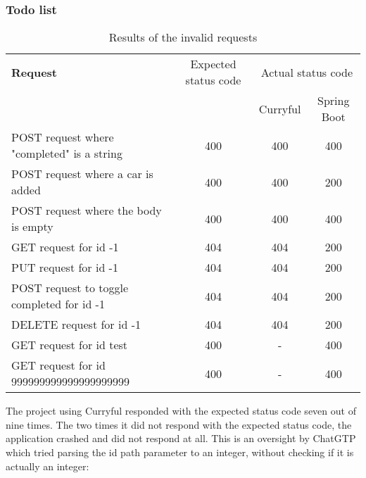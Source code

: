 \documentclass[a4paper]{article}
\begin{document}
\subsubsection{Todo list}
\begin{table}[h!]
	\begin{tabularx}{\textwidth}{|X|c|c|c|}
		\hline
		\textbf{Request}                           & Expected status code & \multicolumn{2}{c|}{Actual status code}               \\
		                                           &                      & Curryful                                & Spring Boot \\
		\hline
		POST request where "completed" is a string & 400                  & 400                                     & 400         \\
		POST request where a car is added          & 400                  & 400                                     & 200         \\
		POST request where the body is empty       & 400                  & 400                                     & 400         \\
		GET request for id -1                      & 404                  & 404                                     & 200         \\
		PUT request for id -1                      & 404                  & 404                                     & 200         \\
		POST request to toggle completed for id -1 & 404                  & 404                                     & 200         \\
		DELETE request for id -1                   & 404                  & 404                                     & 200         \\
		GET request for id test                    & 400                  & -                                       & 400         \\
		GET request for id 999999999999999999999   & 400                  & -                                       & 400         \\
		\hline
	\end{tabularx}
	\caption{Results of the invalid requests}
\end{table}

\noindent The project using Curryful responded with the expected status code
seven out of nine times. The two times it did not respond with the expected
status code, the application crashed and did not respond at all. This is an
oversight by ChatGTP which tried parsing the id path parameter to an integer,
without checking if it is actually an integer:
\end{document}

